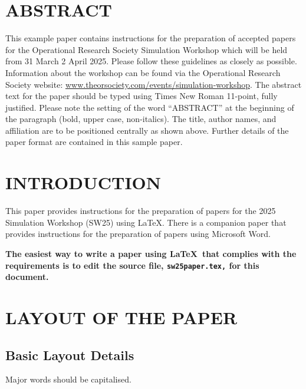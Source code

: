 \documentclass{swpaperproc}
\theoremstyle{sw}
\begin{document}
\section*{ABSTRACT}
This example paper contains instructions for the preparation of accepted papers for the Operational Research Society Simulation Workshop which will be held from 31 March \text{-} 2 April 2025. Please follow these guidelines as closely as possible. Information about the workshop can be found via the Operational Research Society website: \href{https://www.theorsociety.com/ORS/Events/2025/Simulation-Workshop/SW25-Main.aspx?EventKey=SW25&WebsiteKey=c1745213-aec0-45e5-a960-0ec98ebabd4e}{www.theorsociety.com/events/simulation-workshop}. The abstract text for the paper should be typed using Times New Roman 11-point, fully justified. Please note the setting of the word ``ABSTRACT'' at the beginning of the paragraph (bold, upper case, non-italics). The title, author names, and affiliation are to be positioned centrally as shown above. Further details of the paper format are contained in this sample paper. 


\section{INTRODUCTION}
\label{sec:intro}

This paper provides instructions for the preparation of papers for the 2025
Simulation Workshop (SW25) using \LaTeX. There is a companion paper that
provides instructions for the preparation of papers using Microsoft Word.

\textbf{The easiest way to write a paper using \LaTeX\ that complies with the
requirements is to edit the source file, {\tt sw25paper.tex,} for this document.}

\section{LAYOUT OF THE PAPER}

\subsection{Basic Layout Details}

Major words should be capitalised.
\end{document}
